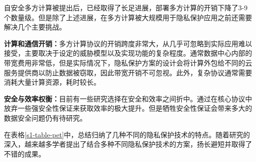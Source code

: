 自安全多方计算被提出后，已经取得了长足进展，部署多方计算的开销下降了3-9个数量级。但是除了上述进展，在多方计算被大规模用于隐私保护应用之前还需要解决几个主要挑战。
\begin{compactitem}
	\item \textbf{计算和通信开销：}多方计算协议的开销跨度非常大，从几乎可忽略到实际应用难以接受，主要取决于设定的威胁模型以及实现功能的复杂程度。通常数据中心内部的带宽费用非常低，但是实际情况下，隐私保护方案的设计会将计算外包给不同的云服务提供商以防止数据被窃取，因此带宽开销不可忽视。此外，复杂协议通常需要消耗大量计算资源，耗时较长。
	\item \textbf{安全与效率权衡：}目前有一些研究选择在安全和效率之间折中。通过在核心协议中放弃一些强安全性保证来获取效率的极大提升。但是牺牲安全性保证会带来多大的数据安全问题仍有待研究。
\end{compactitem}

在表格\ref{s1-table-pet}中，总结归纳了几种不同的隐私保护技术的特点。随着研究的深入，越来越多学者提出了结合多种不同隐私保护技术的方案，扬长避短并取得了不错的成果\cite{2015ABY,jagannathan2005privacy,su2007privacy,bozdemir2021privacy}。

\begin{table}[htbp]
	\centering
	\renewcommand{\arraystretch}{1.3}
	\caption{隐私保护技术对比}
	\label{s1-table-pet}
\end{table}

